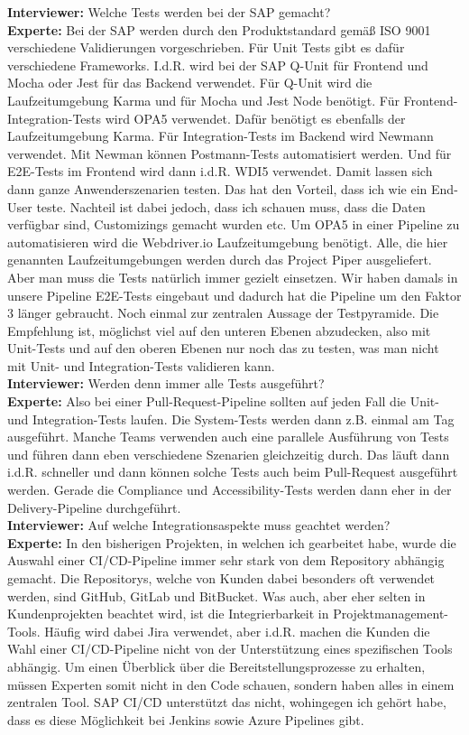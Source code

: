 \begin{linenumbers}
    \textbf{Interviewer:} Welche Tests werden bei der SAP gemacht?\\
    \textbf{Experte:} Bei der SAP werden durch den Produktstandard gemäß ISO 9001 verschiedene Validierungen vorgeschrieben. Für Unit Tests gibt es dafür verschiedene Frameworks. I.d.R. wird bei der SAP Q-Unit für Frontend und Mocha oder Jest für das Backend verwendet. Für Q-Unit wird die Laufzeitumgebung Karma und für Mocha und Jest Node benötigt. Für Frontend-Integration-Tests wird OPA5 verwendet. Dafür benötigt es ebenfalls der Laufzeitumgebung Karma. Für Integration-Tests im Backend wird Newmann verwendet. Mit Newman können Postmann-Tests automatisiert werden. Und für E2E-Tests im Frontend wird dann i.d.R. WDI5 verwendet. Damit lassen sich dann ganze Anwenderszenarien testen. Das hat den Vorteil, dass ich wie ein End-User teste. Nachteil ist dabei jedoch, dass ich schauen muss, dass die Daten verfügbar sind, Customizings gemacht wurden etc. Um OPA5 in einer Pipeline zu automatisieren wird die Webdriver.io Laufzeitumgebung benötigt. Alle, die hier genannten Laufzeitumgebungen werden durch das Project Piper ausgeliefert. Aber man muss die Tests natürlich immer gezielt einsetzen. Wir haben damals in unsere Pipeline E2E-Tests eingebaut und dadurch hat die Pipeline um den Faktor 3 länger gebraucht. Noch einmal zur zentralen Aussage der Testpyramide. Die Empfehlung ist, möglichst viel auf den unteren Ebenen abzudecken, also mit Unit-Tests und auf den oberen Ebenen nur noch das zu testen, was man nicht mit Unit- und Integration-Tests validieren kann.\\
    \textbf{Interviewer:} Werden denn immer alle Tests ausgeführt?\\
    \textbf{Experte:} Also bei einer Pull-Request-Pipeline sollten auf jeden Fall die Unit- und Integration-Tests laufen. Die System-Tests werden dann z.B. einmal am Tag ausgeführt. Manche Teams verwenden auch eine parallele Ausführung von Tests und führen dann eben verschiedene Szenarien gleichzeitig durch. Das läuft dann i.d.R. schneller und dann können solche Tests auch beim Pull-Request ausgeführt werden. Gerade die Compliance und Accessibility-Tests werden dann eher in der Delivery-Pipeline durchgeführt.\\
    \textbf{Interviewer:} Auf welche Integrationsaspekte muss geachtet werden?\\
    \textbf{Experte:} In den bisherigen Projekten, in welchen ich gearbeitet habe, wurde die Auswahl einer CI/CD-Pipeline immer sehr stark von dem Repository abhängig gemacht. Die Repositorys, welche von Kunden dabei besonders oft verwendet werden, sind GitHub, GitLab und BitBucket. Was auch, aber eher selten in Kundenprojekten beachtet wird, ist die Integrierbarkeit in Projektmanagement-Tools. Häufig wird dabei Jira verwendet, aber i.d.R. machen die Kunden die Wahl einer CI/CD-Pipeline nicht von der Unterstützung eines spezifischen Tools abhängig. Um einen Überblick über die Bereitstellungsprozesse zu erhalten, müssen Experten somit nicht in den Code schauen, sondern haben alles in einem zentralen Tool. SAP CI/CD unterstützt das nicht, wohingegen ich gehört habe, dass es diese Möglichkeit bei Jenkins sowie Azure Pipelines gibt.\\ 

\end{linenumbers}
